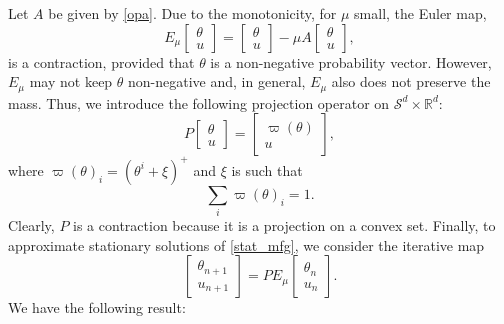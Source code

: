 \documentclass[12pt]{amsart}
\newcommand{\Rr}{{\mathbb{R}}}
\newcommand{\1}{{\chi}}
\newcommand{\Ss}{\mathcal{S}}
\theoremstyle{definition}
\begin{document}
Let $A$ be given by \eqref{opa}. Due to the monotonicity, for $\mu$ small, the Euler map,
\[
E_\mu\left[
\begin{array}{c}
\theta\\
u
\end{array}
\right]
=
\left[
\begin{array}{c}
\theta\\
u
\end{array}
\right]
-\mu A\left[
\begin{array}{c}
\theta\\
u
\end{array}
\right], 
\]
is a contraction, provided that $\theta$ is a non-negative probability vector. However, $E_\mu$ may not keep $\theta$ non-negative
and, in general, $E_\mu$ also does not preserve the mass. Thus, we introduce the following  projection operator on $\Ss^d\times\Rr^d$:
\[
P
\left[
\begin{array}{c}
\theta\\
u
\end{array}
\right]
=
\left[
\begin{array}{c}
\varpi(\theta)\\
u
\end{array}
\right], 
\]
where $\varpi(\theta)_i=(\theta^i+\xi)^+$ and $\xi$ is such that 
\[
\sum_i \varpi(\theta)_i=1. 
\]
Clearly, $P$ is a contraction because it is a projection on a convex set. Finally, to approximate stationary solutions of \eqref{stat_mfg}, we consider the iterative map
\begin{equation}
\label{iterp}
\left[
\begin{array}{c}
\theta_{n+1}\\
u_{n+1}
\end{array}
\right]
=
P E_\mu
\left[
\begin{array}{c}
\theta_{n}\\
u_{n}
\end{array}
\right]. 
\end{equation}
We have the following result:
\end{document}
